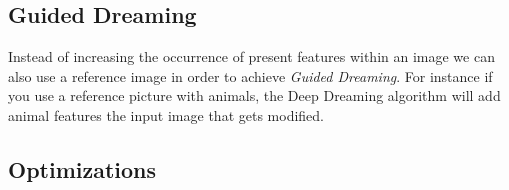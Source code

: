 






\subsection{Guided Dreaming}
Instead of increasing the occurrence of present features within an image we can also use a reference image in order to achieve \emph{Guided Dreaming}.
For instance if you use a reference picture with animals, the Deep Dreaming algorithm will add animal features the input image that gets modified.


\subsection{Optimizations}
\label{sec:optimizations}
